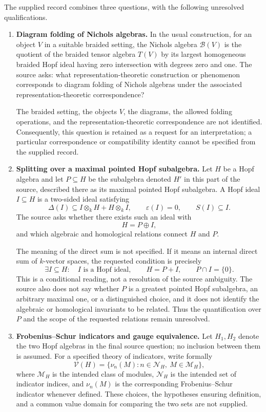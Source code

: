 \documentclass[11pt]{article}
\begin{document}
The supplied record combines three questions, with the following unresolved qualifications.
\begin{enumerate}
\item \textbf{Diagram folding of Nichols algebras.} In the usual construction, for an object \(V\) in a suitable braided setting, the Nichols algebra \(\mathcal B(V)\) is the quotient of the braided tensor algebra \(T(V)\) by its largest homogeneous braided Hopf ideal having zero intersection with degrees zero and one. The source asks: what representation-theoretic construction or phenomenon corresponds to diagram folding of Nichols algebras under the associated representation-theoretic correspondence?

The braided setting, the objects \(V\), the diagrams, the allowed folding operations, and the representation-theoretic correspondence are not identified. Consequently, this question is retained as a request for an interpretation; a particular correspondence or compatibility identity cannot be specified from the supplied record.

\item \textbf{Splitting over a maximal pointed Hopf subalgebra.} Let \(H\) be a Hopf algebra and let \(P\subseteq H\) be the subalgebra denoted \(H'\) in this part of the source, described there as its maximal pointed Hopf subalgebra. A Hopf ideal \(I\subseteq H\) is a two-sided ideal satisfying
\[
\Delta(I)\subseteq I\otimes_k H+H\otimes_k I,
\qquad \varepsilon(I)=0,
\qquad S(I)\subseteq I.
\]
The source asks whether there exists such an ideal with
\[
H=P\oplus I,
\]
and which algebraic and homological relations connect \(H\) and \(P\).

The meaning of the direct sum is not specified. If it means an internal direct sum of \(k\)-vector spaces, the requested condition is precisely
\[
\exists I\subseteq H:\quad I\text{ is a Hopf ideal},\qquad
H=P+I,\qquad P\cap I=\{0\}.
\]
This is a conditional reading, not a resolution of the source ambiguity. The source also does not say whether \(P\) is a greatest pointed Hopf subalgebra, an arbitrary maximal one, or a distinguished choice, and it does not identify the algebraic or homological invariants to be related. Thus the quantification over \(P\) and the scope of the requested relations remain unresolved.

\item \textbf{Frobenius--Schur indicators and gauge equivalence.} Let \(H_1,H_2\) denote the two Hopf algebras in the final source question; no inclusion between them is assumed. For a specified theory of indicators, write formally
\[
\mathcal V(H)=\{\nu_n(M): n\in\mathcal N_H,\ M\in\mathcal M_H\},
\]
where \(\mathcal M_H\) is the intended class of modules, \(\mathcal N_H\) is the intended set of indicator indices, and \(\nu_n(M)\) is the corresponding Frobenius--Schur indicator whenever defined. These choices, the hypotheses ensuring definition, and a common value domain for comparing the two sets are not supplied.


\end{enumerate}
\end{document}
